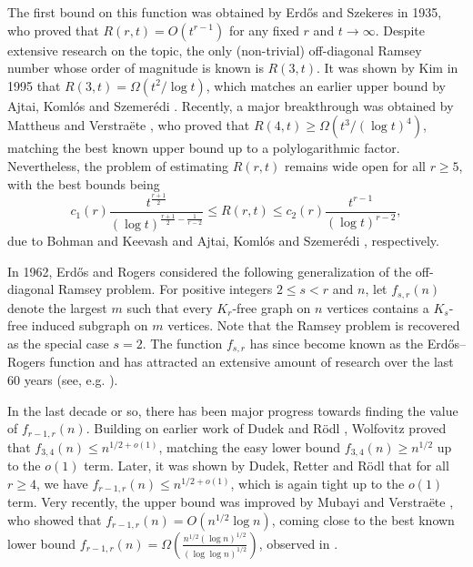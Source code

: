\documentclass[11pt]{article}
\theoremstyle{plain}
\theoremstyle{definition}
\begin{document}
The first bound on this function was obtained by Erd\H os and Szekeres \cite{ESz35} in 1935, who proved that $R(r,t)=O(t^{r-1})$ for any fixed $r$ and $t\rightarrow \infty$.
Despite extensive research on the topic, the only (non-trivial) off-diagonal Ramsey number whose order of magnitude is known is $R(3,t)$. It was shown by Kim \cite{Kim95} in 1995 that $R(3,t)=\Omega(t^2/\log t)$, which matches an earlier upper bound by Ajtai, Koml\'os and Szemer\'edi \cite{AKSz80}.
Recently, a major breakthrough was obtained by Mattheus and Verstra\"ete \cite{Mattheus_Verstraete}, who proved that $R(4,t)\geq \Omega(t^{3}/(\log t)^4)$, matching the best known upper bound up to a polylogarithmic factor. Nevertheless, the problem of estimating $R(r,t)$ remains wide open for all $r\geq 5$, with the best bounds being $$c_1(r)\frac{t^{\frac{r+1}{2}}}{(\log t)^{\frac{r+1}{2}-\frac{1}{r-2}}}\leq R(r,t)\leq c_2(r) \frac{t^{r-1}}{(\log t)^{r-2}},$$
due to Bohman and Keevash \cite{BK10} and Ajtai, Koml\'os and Szemer\'edi \cite{AKSz80}, respectively.

In 1962, Erd\H os and Rogers \cite{ER62} considered the following generalization of the off-diagonal Ramsey problem. For positive integers $2\leq s<r$ and $n$, let $f_{s,r}(n)$ denote the largest $m$ such that every $K_r$-free graph on $n$ vertices contains a $K_s$-free induced subgraph on $m$ vertices. Note that the Ramsey problem is recovered as the special case $s=2$. The function $f_{s,r}$ has since become known as the Erd\H os--Rogers function and has attracted an extensive amount of research over the last 60 years (see, e.g. \cite{ER62,BH91,Kri94,Kri95,AK97,Sudakov,Sudakov_DRC,DR11,Dudek_Rodl,Wolfovitz,DM14,Dudek_Retter_Rodl,Gowers_Janzer,Janzer_Sudakov,MV_improved_bound}). 

In the last decade or so, there has been major progress towards finding the value of $f_{r-1,r}(n)$. Building on earlier work of Dudek and R\"odl \cite{DR11}, Wolfovitz \cite{Wolfovitz} proved that $f_{3,4}(n)\leq n^{1/2+o(1)}$, matching the easy lower bound $f_{3,4}(n)\geq n^{1/2}$ up to the $o(1)$ term. Later, it was shown by Dudek, Retter and R\"odl \cite{Dudek_Retter_Rodl} that for all $r\geq 4$, we have $f_{r-1,r}(n)\leq n^{1/2+o(1)}$, which is again tight up to the $o(1)$ term. Very recently, the upper bound was improved by Mubayi and Verstra\"ete \cite{MV_improved_bound}, who showed that $f_{r-1,r}(n)= O(n^{1/2}\log n)$, coming close to the best known lower bound $f_{r-1,r}(n)=\Omega\left(\frac{n^{1/2}(\log n)^{1/2}}{(\log \log n)^{1/2}}\right)$, observed in \cite{DM14}.
\end{document}
